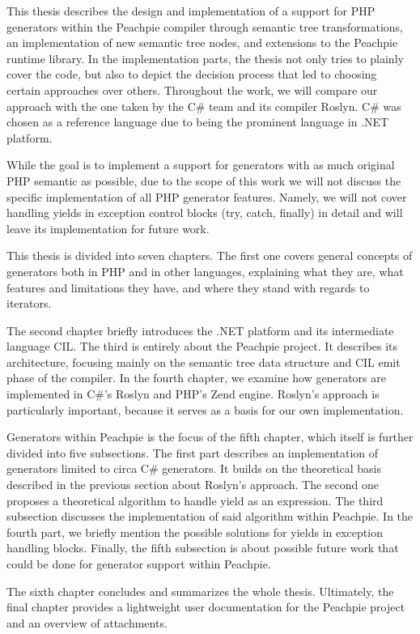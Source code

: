 This thesis describes the design and implementation of a support for PHP generators within the Peachpie compiler through semantic tree transformations, an implementation of new semantic tree nodes, and extensions to the Peachpie runtime library. In the implementation parts, the thesis not only tries to plainly cover the code, but also to depict the decision process that led to choosing certain approaches over others. Throughout the work, we will compare our approach with the one taken by the C\# team and its compiler Roslyn. C\# was chosen as a reference language due to  being the prominent language in .NET platform.

While the goal is to implement a support for generators with as much original PHP semantic as possible, due to the scope of this work we will not discuss the specific implementation of all PHP generator features. Namely, we will not cover handling yields in exception control blocks (try, catch, finally) in detail and will leave its implementation for future work.

This thesis is divided into seven chapters. The first one covers general concepts of generators both in PHP and in other languages, explaining what they are, what features and limitations they have, and where they stand with regards to iterators. 

The second chapter briefly introduces the .NET platform and its intermediate language CIL. The third is entirely about the Peachpie project. It describes its architecture, focusing mainly on the semantic tree data structure and CIL emit phase of the compiler. In the fourth chapter, we examine how generators are implemented in C\#’s Roslyn and PHP’s Zend engine. Roslyn’s approach is particularly important, because it serves as a basis for our own implementation.
 
Generators within Peachpie is the focus of the fifth chapter, which itself is further divided into five subsections. The first part describes an implementation of generators limited to circa C\# generators. It builds on the theoretical basis described in the previous section about Roslyn’s approach. The second one proposes a theoretical algorithm to handle yield as an expression. The third subsection discusses the implementation of said algorithm within Peachpie. In the fourth part, we briefly mention the possible solutions for yields in exception handling blocks. Finally, the fifth subsection is about possible future work that could be done for generator support within Peachpie. 

The sixth chapter concludes and summarizes the whole thesis. Ultimately, the final chapter provides a lightweight user documentation for the Peachpie project and an overview of attachments.
